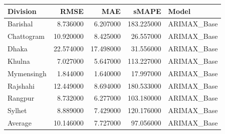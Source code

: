 \begin{tabular}{lrrrl}
\toprule
Division & RMSE & MAE & sMAPE & Model \\
\midrule
Barishal & 8.736000 & 6.207000 & 183.225000 & ARIMAX_Base \\
Chattogram & 10.920000 & 8.425000 & 26.557000 & ARIMAX_Base \\
Dhaka & 22.574000 & 17.498000 & 31.556000 & ARIMAX_Base \\
Khulna & 7.027000 & 5.647000 & 113.227000 & ARIMAX_Base \\
Mymensingh & 1.844000 & 1.640000 & 17.997000 & ARIMAX_Base \\
Rajshahi & 12.449000 & 8.694000 & 180.533000 & ARIMAX_Base \\
Rangpur & 8.732000 & 6.277000 & 103.180000 & ARIMAX_Base \\
Sylhet & 8.889000 & 7.429000 & 120.176000 & ARIMAX_Base \\
Average & 10.146000 & 7.727000 & 97.056000 & ARIMAX_Base \\
\bottomrule
\end{tabular}
